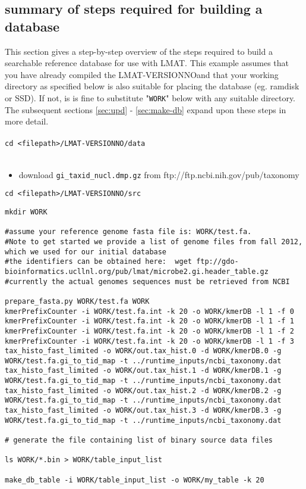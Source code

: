 \documentclass[11pt]{article}
\newcommand{\lmatver}{VERSIONNO}
\begin{document}
\subsection{summary of steps required for building a database} 
This section gives a step-by-step overview of the steps required to build a searchable reference database for use with LMAT.
This example assumes that you have already compiled the LMAT-\lmatver and that your working directory as specified below is also suitable for placing the database (eg. ramdisk or SSD).  If not, is is fine to substitute "\texttt{WORK}" below with any suitable directory.  The subsequent sections \ref{sec:upd} - \ref{sec:make-db} expand upon these steps in more detail.\\
\\
\texttt{cd <filepath>/LMAT-\lmatver/data}\\
\\
\begin{itemize}
\item
download \texttt{gi\_taxid\_nucl.dmp.gz} from ftp://ftp.ncbi.nih.gov/pub/taxonomy
\end{itemize}
\texttt{cd <filepath>/LMAT-\lmatver/src}\\
\begin{verbatim}
mkdir WORK

#assume your reference genome fasta file is: WORK/test.fa.  
#Note to get started we provide a list of genome files from fall 2012, which we used for our initial database
#the identifiers can be obtained here:  wget ftp://gdo-bioinformatics.ucllnl.org/pub/lmat/microbe2.gi.header_table.gz
#currently the actual genomes sequences must be retrieved from NCBI

prepare_fasta.py WORK/test.fa WORK
kmerPrefixCounter -i WORK/test.fa.int -k 20 -o WORK/kmerDB -l 1 -f 0
kmerPrefixCounter -i WORK/test.fa.int -k 20 -o WORK/kmerDB -l 1 -f 1
kmerPrefixCounter -i WORK/test.fa.int -k 20 -o WORK/kmerDB -l 1 -f 2
kmerPrefixCounter -i WORK/test.fa.int -k 20 -o WORK/kmerDB -l 1 -f 3
tax_histo_fast_limited -o WORK/out.tax_hist.0 -d WORK/kmerDB.0 -g WORK/test.fa.gi_to_tid_map -t ../runtime_inputs/ncbi_taxonomy.dat
tax_histo_fast_limited -o WORK/out.tax_hist.1 -d WORK/kmerDB.1 -g WORK/test.fa.gi_to_tid_map -t ../runtime_inputs/ncbi_taxonomy.dat
tax_histo_fast_limited -o WORK/out.tax_hist.2 -d WORK/kmerDB.2 -g WORK/test.fa.gi_to_tid_map -t ../runtime_inputs/ncbi_taxonomy.dat
tax_histo_fast_limited -o WORK/out.tax_hist.3 -d WORK/kmerDB.3 -g WORK/test.fa.gi_to_tid_map -t ../runtime_inputs/ncbi_taxonomy.dat

# generate the file containing list of binary source data files

ls WORK/*.bin > WORK/table_input_list
 
make_db_table -i WORK/table_input_list -o WORK/my_table -k 20

\end{verbatim}
\end{document}
